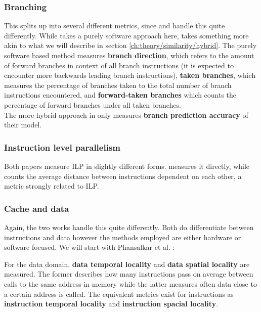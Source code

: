 \documentclass[../bachelor_paper.tex]{subfiles}
\begin{document}
\subsubsection{Branching} 
This splits up into several different metrics, since \cite{phansalkarMeasuringProgramSimilarity2005} and \cite{eeckhoutDesigningComputerArchitecture2003} handle this quite differently. While \cite{phansalkarMeasuringProgramSimilarity2005} takes a purely software approach here, \cite{eeckhoutDesigningComputerArchitecture2003} takes something more akin to what we will describe in section \ref{ch:theory/similarity/hybrid}. The purely software based method measures \textbf{branch direction}, which refers to the amount of forward branches in context of all branch instructions (it is expected to encounter more backwards leading branch instructions), \textbf{taken branches}, which measures the percentage of branches taken to the total number of branch instructions encountered, and \textbf{forward-taken branches} which counts the percentage of forward branches under all taken branches.\\
The more hybrid approach in \cite{eeckhoutDesigningComputerArchitecture2003} only measures \textbf{branch prediction accuracy} of their model.

\subsubsection{Instruction level parallelism}
Both papers measure \ac{ILP} in slightly different forms. \cite{eeckhoutDesigningComputerArchitecture2003} measures it directly, while \cite{phansalkarMeasuringProgramSimilarity2005} counts the average distance between instructions dependent on each other, a metric strongly related to \ac{ILP}.

\subsubsection{Cache and data}
Again, the two works handle this quite differently. Both do differentiate between instructions and data however the methods employed are either hardware or software focused. We will start with Phansalkar et al. \cite{phansalkarMeasuringProgramSimilarity2005}:

For the data domain, \textbf{data temporal locality} and \textbf{data spatial locality} are measured. The former describes how many instructions pass on average between calls to the same address in memory while the latter measures often data close to a certain address is called. The equivalent metrics exist for instructions as \textbf{instruction temporal locality} and \textbf{instruction spacial locality}.
\end{document}

